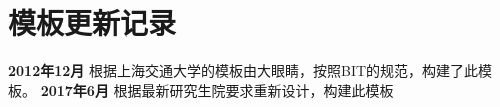 \chapter{模板更新记录}
\label{chap:updatelog}

\textbf{2012年12月} 根据上海交通大学的模板由大眼睛，按照BIT的规范，构建了此模板。
\textbf{2017年6月} 根据最新研究生院要求重新设计，构建此模板
